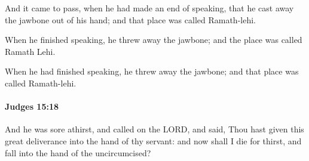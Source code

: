 			\begin{versebox}
					\item[BHS] 
					\item[ASV] And it came to pass, when he had made an end of speaking, that he cast away the jawbone out of his hand; and that place was called Ramath-lehi.
					\item[NIV] When he finished speaking, he threw away the jawbone; and the place was called Ramath Lehi.
					\item[NRSV] When he had finished speaking, he threw away the jawbone; and that place was called Ramath-lehi.
			\end{versebox}

		\paragraph{Judges 15:18} %
			\label{JUDGES-15-18}

			And he was sore athirst, and called on the LORD, and said, Thou hast given this great deliverance into the hand of thy servant: and now shall I die for thirst, and fall into the hand of the uncircumcised?

